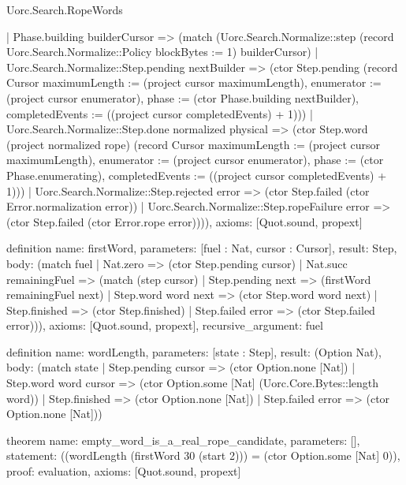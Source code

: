 \begin{lexlean}{Uorc.Search.RopeWords}
\begin{semanticmodule}
{    | Phase.building builderCursor => (match (Uorc.Search.Normalize::step (record Uorc.Search.Normalize::Policy {blockBytes := 1}) builderCursor)
      | Uorc.Search.Normalize::Step.pending nextBuilder => (ctor Step.pending (record Cursor {maximumLength := (project cursor maximumLength), enumerator := (project cursor enumerator), phase := (ctor Phase.building nextBuilder), completedEvents := ((project cursor completedEvents) + 1)}))
      | Uorc.Search.Normalize::Step.done normalized physical => (ctor Step.word (project normalized rope) (record Cursor {maximumLength := (project cursor maximumLength), enumerator := (project cursor enumerator), phase := (ctor Phase.enumerating), completedEvents := ((project cursor completedEvents) + 1)}))
      | Uorc.Search.Normalize::Step.rejected error => (ctor Step.failed (ctor Error.normalization error))
      | Uorc.Search.Normalize::Step.ropeFailure error => (ctor Step.failed (ctor Error.rope error)))),
  axioms: [Quot.sound, propext]
}

definition{
  name: firstWord,
  parameters: [fuel : Nat, cursor : Cursor],
  result: Step,
  body: (match fuel
    | Nat.zero => (ctor Step.pending cursor)
    | Nat.succ remainingFuel => (match (step cursor)
      | Step.pending next => (firstWord remainingFuel next)
      | Step.word word next => (ctor Step.word word next)
      | Step.finished => (ctor Step.finished)
      | Step.failed error => (ctor Step.failed error))),
  axioms: [Quot.sound, propext],
  recursive_argument: fuel
}

definition{
  name: wordLength,
  parameters: [state : Step],
  result: (Option Nat),
  body: (match state
    | Step.pending cursor => (ctor Option.none [Nat])
    | Step.word word cursor => (ctor Option.some [Nat] (Uorc.Core.Bytes::length word))
    | Step.finished => (ctor Option.none [Nat])
    | Step.failed error => (ctor Option.none [Nat]))
}

theorem{
  name: empty_word_is_a_real_rope_candidate,
  parameters: [],
  statement: ((wordLength (firstWord 30 (start 2))) = (ctor Option.some [Nat] 0)),
  proof: evaluation{},
  axioms: [Quot.sound, propext]
}
\end{semanticmodule}
\end{lexlean}
